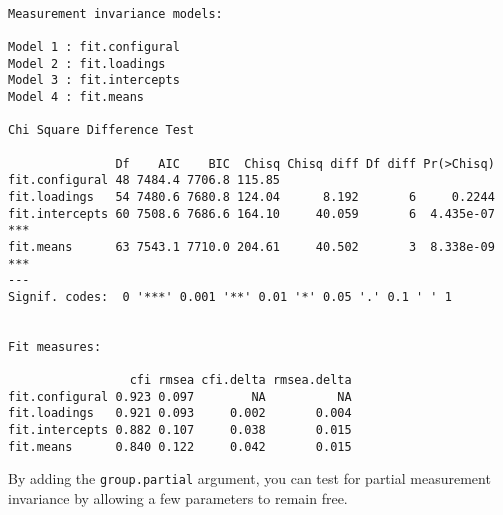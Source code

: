 \begin{verbatim}

Measurement invariance models:

Model 1 : fit.configural
Model 2 : fit.loadings
Model 3 : fit.intercepts
Model 4 : fit.means

Chi Square Difference Test

               Df    AIC    BIC  Chisq Chisq diff Df diff Pr(>Chisq)    
fit.configural 48 7484.4 7706.8 115.85                                  
fit.loadings   54 7480.6 7680.8 124.04      8.192       6     0.2244    
fit.intercepts 60 7508.6 7686.6 164.10     40.059       6  4.435e-07 ***
fit.means      63 7543.1 7710.0 204.61     40.502       3  8.338e-09 ***
---
Signif. codes:  0 '***' 0.001 '**' 0.01 '*' 0.05 '.' 0.1 ' ' 1


Fit measures:

                 cfi rmsea cfi.delta rmsea.delta
fit.configural 0.923 0.097        NA          NA
fit.loadings   0.921 0.093     0.002       0.004
fit.intercepts 0.882 0.107     0.038       0.015
fit.means      0.840 0.122     0.042       0.015
\end{verbatim}

By adding the \texttt{group.partial} argument, you can test for partial
measurement invariance by allowing a few parameters to remain free.
